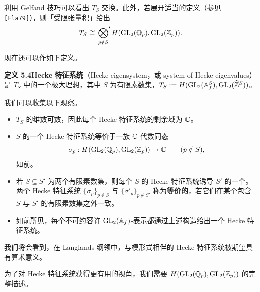 利用 Gelfand 技巧可以看出 $T_S$ 交换。此外，若展开适当的定义（参见 \texttt{[Fla79]}），则「受限张量积」给出
\[
T_S\cong\sideset{}{'}\bigotimes_{p\notin S}H(\operatorname{GL}_2(\mathbb{Q}_p),\operatorname{GL}_2(\mathbb{Z}_p)).
\]

现在还可以作如下定义。

\noindent\textbf{定义 5.4}\label{def:5.4}\quad \textbf{Hecke 特征系统}（Hecke eigensystem，或 system of Hecke eigenvalues）是 $T_S$ 中的一个极大理想，其中 $S$ 为有限素数集，$T_S:=H(\operatorname{GL}_2(\mathbb{A}_f^S),\operatorname{GL}_2(\widehat{\mathbb{Z}}^S))$。

我们可以收集以下观察。
\begin{itemize}
\item $T_S$ 的维数可数，因此每个 Hecke 特征系统的剩余域为 $\mathbb{C}$。
\item $S$ 的一个 Hecke 特征系统等价于一族 $\mathbb{C}$-代数同态
\[
\sigma_p:H(\operatorname{GL}_2(\mathbb{Q}_p),\operatorname{GL}_2(\mathbb{Z}_p))\to\mathbb{C}\qquad(p\notin S),
\]
如前。
\item 若 $S\subseteq S'$ 为两个有限素数集，则每个 $S$ 的 Hecke 特征系统诱导 $S'$ 的一个。两个 Hecke 特征系统 $\{\sigma_p\}_{p\notin S}$ 与 $\{\sigma'_p\}_{p\notin S'}$ 称为\textbf{等价的}，若它们在某个包含 $S$ 与 $S'$ 的有限素数集之外一致。
\item 如前所见，每个不可约容许 $\operatorname{GL}_2(\mathbb{A}_f)$-表示都通过上述构造给出一个 Hecke 特征系统。
\end{itemize}

我们将会看到，在 Langlands 纲领中，与模形式相伴的 Hecke 特征系统被期望具有算术意义。

为了对 Hecke 特征系统获得更有用的视角，我们需要 $H(\operatorname{GL}_2(\mathbb{Q}_p),\operatorname{GL}_2(\mathbb{Z}_p))$ 的完整描述。

